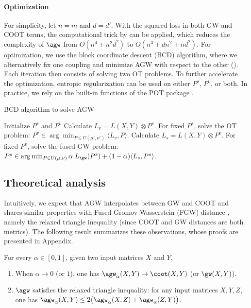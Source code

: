 \paragraph{Optimization} For simplicity, let $n = m$ and $d = d'$.
With the squared loss in both GW and COOT terms, the computational trick by \citep{Peyre16}
can be applied, which reduces the complexity of $\agw$ from $O(n^4 + n^2 d^2)$
to $O(n^3 + dn^2 + nd^2)$. For optimization, we use the block coordinate descent (BCD) algorithm,
where we alternatively fix one coupling and minimize AGW with respect to the other ().
Each iteration then consists of solving two OT problems. To further accelerate the optimization,
entropic regularization can be used \citep{Cuturi13} on either $P^s$, $P^v$, or both.
In practice, we rely on the built-in functions of the POT package \citep{Flamary21}.

\begin{algorithm}[!t]
    \caption{BCD algorithm to solve AGW \label{alg:bcd}}
    \begin{algorithmic}[t]
      \STATE Initialize $P^s$ and $P^v$
      \REPEAT
      \STATE Calculate $L_v = L(X, Y) \otimes P^s$.
      \STATE For fixed $P^s$, solve the OT problem:
      $P^v \in \arg\min_{P \in U(\mu', \nu')} \langle L_v, P \rangle$.
      \STATE Calculate $L_s = L(X, Y) \otimes P^v$.
      \STATE For fixed $P^v$, solve the fused GW problem:
      $P^s \in \arg\min_{P \in U(\mu, \nu)} \alpha \; L_{\gw} (P^s)
      + (1-\alpha) \langle L_s, P^s \rangle$.
\end{algorithmic}
\end{algorithm}

\subsection{Theoretical analysis}

Intuitively, we expect that AGW interpolates between GW and COOT and shares similar properties
with Fused Gromov-Wasserstein (FGW) distance \citep{Vayer19b}, namely
the relaxed triangle inequality (since COOT and GW distances are both metrics).
The following result summarizes these observations, whose proofs are presented in
Appendix.
\begin{proposition}
\label{prop:basic_prop}
For every $\alpha \in [0, 1]$, given two input matrices $X$ and $Y$,
\begin{enumerate}
    \item When $\alpha \to 0$ (or $1$), one has $\agw_{\alpha}(X, Y) \to \coot(X, Y)$ (or $\gw(X, Y)$).

    \item $\agw$ satisfies the relaxed triangle inequality: for any input matrices $X, Y, Z$,
    one has $\agw_{\alpha}(X, Y) \leq 2 \big( \agw_{\alpha}(X, Z) + \agw_{\alpha}(Z, Y) \big)$.
\end{enumerate}
\end{proposition}

